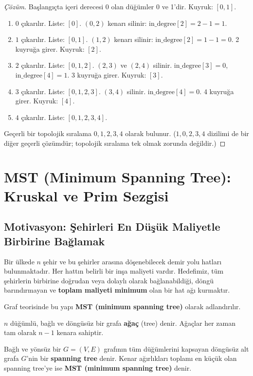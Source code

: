 \begin{example}
\begin{proof}[Çözüm]
Başlangıçta içeri derecesi 0 olan düğümler 0 ve 1'dir. Kuyruk: $[0, 1]$.
\begin{enumerate}
    \item $0$ çıkarılır. Liste: $[0]$. $(0, 2)$ kenarı silinir: $\text{in\_degree}[2] = 2 - 1 = 1$.
    \item $1$ çıkarılır. Liste: $[0, 1]$. $(1, 2)$ kenarı silinir: $\text{in\_degree}[2] = 1 - 1 = 0$. 2 kuyruğa girer. Kuyruk: $[2]$.
    \item $2$ çıkarılır. Liste: $[0, 1, 2]$. $(2, 3)$ ve $(2, 4)$ silinir. $\text{in\_degree}[3] = 0$, $\text{in\_degree}[4] = 1$. 3 kuyruğa girer. Kuyruk: $[3]$.
    \item $3$ çıkarılır. Liste: $[0, 1, 2, 3]$. $(3, 4)$ silinir. $\text{in\_degree}[4] = 0$. 4 kuyruğa girer. Kuyruk: $[4]$.
    \item $4$ çıkarılır. Liste: $[0, 1, 2, 3, 4]$.
\end{enumerate}
Geçerli bir topolojik sıralama $0, 1, 2, 3, 4$ olarak bulunur. ($1, 0, 2, 3, 4$ dizilimi de bir diğer geçerli çözümdür; topolojik sıralama tek olmak zorunda değildir.)
\end{proof}
\end{example}

\section{MST (Minimum Spanning Tree): Kruskal ve Prim Sezgisi}

\subsection{Motivasyon: Şehirleri En Düşük Maliyetle Birbirine Bağlamak}
Bir ülkede $n$ şehir ve bu şehirler arasına döşenebilecek demir yolu hatları bulunmaktadır. Her hattın belirli bir inşa maliyeti vardır. Hedefimiz, tüm şehirlerin birbirine doğrudan veya dolaylı olarak bağlanabildiği, döngü barındırmayan ve \textbf{toplam maliyeti minimum} olan bir hat ağı kurmaktır.

Graf teorisinde bu yapı \textbf{MST (minimum spanning tree)} olarak adlandırılır.

\begin{definition}
$n$ düğümlü, bağlı ve döngüsüz bir grafa \textbf{ağaç} (tree) denir. Ağaçlar her zaman tam olarak $n-1$ kenara sahiptir.

Bağlı ve yönsüz bir $G=(V, E)$ grafının tüm düğümlerini kapsayan döngüsüz alt grafa $G$'nin bir \textbf{spanning tree} denir. Kenar ağırlıkları toplamı en küçük olan spanning tree'ye ise \textbf{MST (minimum spanning tree)} denir.
\end{definition}

